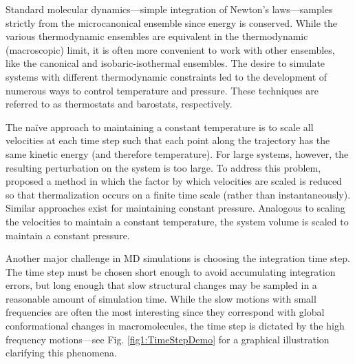 Standard molecular dynamics---simple integration of Newton's laws---samples
strictly from the microcanonical ensemble since energy is conserved. While the
various thermodynamic ensembles are equivalent in the thermodynamic
(macroscopic) limit, it is often more convenient to work with other ensembles,
like the canonical and isobaric-isothermal ensembles. The desire to simulate
systems with different thermodynamic constraints led to the development of
numerous ways to control temperature and pressure.
\cite{Leach_Book_MolModel_2001} These techniques are referred to as thermostats
and barostats, respectively.

The na\"ive approach to maintaining a constant temperature is to scale all
velocities at each time step such that each point along the trajectory has the
same kinetic energy (and therefore temperature). \cite{Woodcock1971} For large
systems, however, the resulting perturbation on the system is too large. To
address this problem, \citeauthor{Berendsen_JChemPhys_1984_v81_p3684} proposed a
method in which the factor by which velocities are scaled is reduced so that
thermalization occurs on a finite time scale (rather than instantaneously).
\cite{Berendsen_JChemPhys_1984_v81_p3684} Similar approaches exist for
maintaining constant pressure. \cite{Berendsen_JChemPhys_1984_v81_p3684}
Analogous to scaling the velocities to maintain a constant temperature, the
system volume is scaled to maintain a constant pressure.

Another major challenge in MD simulations is choosing the integration time step.
The time step must be chosen short enough to avoid accumulating integration
errors, but long enough that slow structural changes may be sampled in a
reasonable amount of simulation time. While the slow motions with small
frequencies are often the most interesting since they correspond with global
conformational changes in macromolecules, the time step is dictated by the high
frequency motions---see Fig. \ref{fig1:TimeStepDemo} for a graphical
illustration clarifying this phenomena.

